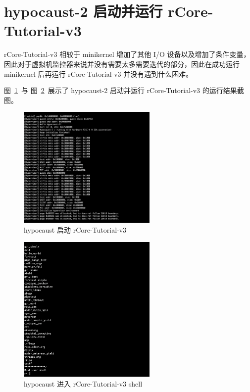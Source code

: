 \section{hypocaust-2 启动并运行 rCore-Tutorial-v3}
rCore-Tutorial-v3 相较于 minikernel 增加了其他 I/O 设备以及增加了条件变量，因此对于虚拟机监控器来说并没有需要太多需要迭代的部分，因此在成功运行 minikernel 后再运行 rCore-Tutorial-v3 并没有遇到什么困难。

图~\ref{fig:hypocaust-2-rCore-Tutorial-v3-1}~与 图~\ref{fig:hypocaust-2-rCore-Tutorial-v3-2}~展示了 hypocaust-2 启动并运行 rCore-Tutorial-v3 的运行结果截图。



\begin{figure}[]
    \centering
    \includegraphics[width=0.6\textwidth]{thesis-images/hypocaust-2-rCore-Tutorial-v3-1.png}
    \caption{hypocaust 启动 rCore-Tutorial-v3}\label{fig:hypocaust-2-rCore-Tutorial-v3-1}
\end{figure}

\begin{figure}[]
    \centering
    \includegraphics[width=0.6\textwidth]{thesis-images/hypocaust-2-rCore-Tutorial-v3-2.png}
    \caption{hypocaust 进入 rCore-Tutorial-v3 shell}\label{fig:hypocaust-2-rCore-Tutorial-v3-2}
\end{figure}


